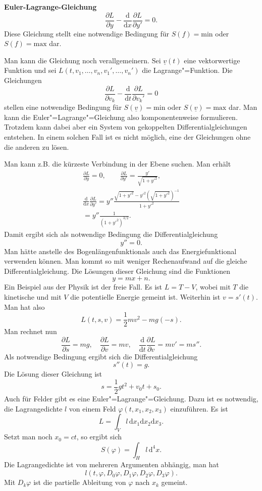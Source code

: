 \documentclass[a4paper,10pt,fleqn,twocolumn,twoside]{article}
\begin{document}
\textbf{Euler-Lagrange-Gleichung}
\[\frac{\partial L}{\partial y}
-\frac{\mathrm d}{\mathrm dx}\frac{\partial L}{\partial y'}
=0.\]
Diese Gleichung stellt eine notwendige Bedingung für \(S(f)=\mathrm{min}\) oder
\(S(f)=\mathrm{max}\) dar.

Man kann die Gleichung noch verallgemeinern. Sei \(\underline v(t)\)
eine vektorwertige Funktion und sei
\(L(t,v_1,\ldots,v_n,v_1',\ldots,v_n')\) die Lagrange"=Funktion.
Die Gleichungen
\[\frac{\partial L}{\partial v_k}
-\frac{\mathrm d}{\mathrm dt}\frac{\partial L}{\partial v_k'}
=0\]
stellen eine notwendige Bedingung für
\(S(\underline v)=\mathrm{min}\) oder
\(S(\underline v)=\mathrm{max}\) dar.
Man kann die Euler"=Lagrange"=Gleichung also komponentenweise
formulieren. Trotzdem kann dabei aber ein System von gekoppelten
Differentialgleichungen entstehen. In einem solchen Fall ist es
nicht möglich, eine der Gleichungen ohne die anderen zu lösen.

Man kann z.B. die kürzeste Verbindung in der Ebene suchen. Man erhält
\begin{gather*}
\frac{\partial L}{\partial y} = 0,\qquad
\frac{\partial L}{\partial y'} = \frac{y'}{\sqrt{1+y'^2}},\\
\frac{\mathrm d}{\mathrm dx}\frac{\partial L}{\partial y'}
= y''\frac{\sqrt{1+y'^2}-y'^2(\sqrt{1+y'^2})^{-1}}{1+y'^2}\\
= y''\frac{1}{(1+y'^2)^{3/2}}.
\end{gather*}
Damit ergibt sich als notwendige Bedingung die Differentialgleichung
\[y''=0.\]
Man hätte anstelle des Bogenlängenfunktionals auch das
Energiefunktional verwenden können. Man kommt so mit weniger
Rechenaufwand auf die gleiche Differentialgleichung.
Die Lösungen dieser Gleichung sind die Funktionen
\[y=mx+n.\]
Ein Beispiel aus der Physik ist der freie Fall. Es ist \(L=T-V\),
wobei mit \(T\) die kinetische und mit \(V\) die potentielle Energie
gemeint ist. Weiterhin ist \(v=s'(t)\). Man hat also
\[L(t,s,v) = \frac{1}{2}mv^2 - mg(-s).\]
Man rechnet nun
\[
\frac{\partial L}{\partial s} = mg,\quad
\frac{\partial L}{\partial v} = mv,\quad
\frac{\mathrm d}{\mathrm dt}\frac{\partial L}{\partial v}
= mv' = ms''.
\]
Als notwendige Bedingung ergibt sich die Differentialgleichung
\[s''(t) = g.\]
Die Lösung dieser Gleichung ist
\[s=\frac{1}{2}gt^2+v_0t+s_0.\]
%
Auch für Felder gibt es eine Euler"=Lagrange"=Gleichung. Dazu ist es
notwendig, die Lagrangedichte \(l\) von einem Feld
\(\varphi(t,x_1,x_2,x_3)\) einzuführen. Es ist
\[L = \int_V l\,\mathrm dx_1\mathrm dx_2\mathrm dx_3.\]
Setzt man noch \(x_0=ct\), so ergibt sich
\[S(\varphi) = \int_H l\,\mathrm d^4x.\]
Die Lagrangedichte ist von mehreren Argumenten abhängig, man hat
\[l(t,\varphi,D_0\varphi, D_1\varphi, D_2\varphi, D_3\varphi).\]
Mit \(D_k\varphi\) ist die partielle Ableitung von \(\varphi\)
nach \(x_k\) gemeint.
\end{document}
